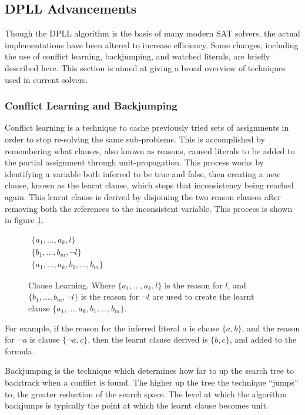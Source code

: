 \subsection{DPLL Advancements}
Though the DPLL algorithm is the basis of many modern SAT solvers, the actual implementations have been altered to increase efficiency.
Some changes, including the use of conflict learning, backjumping, and watched literals, are briefly described here.
This section is aimed at giving a broad overview of techniques used in current solvers.

\subsubsection{Conflict Learning and Backjumping}
Conflict learning \citep{stallman1976} is a technique to cache previously tried sets of assignments in order to stop re-solving the same sub-problems.
This is accomplished by remembering what clauses, also known as reasons, caused literals to be added to the partial assignment through unit-propagation. 
This process works by identifying a variable both inferred to be true and false,
then creating a new clause, known as the learnt clause, which stops that inconsistency being reached again.
This learnt clause is derived by disjoining the two reason clauses after removing both the references to the inconsistent variable.
This process is shown in figure \ref{impl.clauselearning}. 

\begin{figure}[htp]
\begin{center}
$\begin{array}{c}
\{a_1,\ldots,a_k, l\} \\
 \{b_1,\ldots,b_m,\neg l\}\\
\hline
\{a_1,\ldots,a_k, b_1,\ldots,b_m \}
\end{array}$
  \caption{Clause Learning. Where $\{a_1,\ldots,a_k, l\}$ is the reason for $l$, and $\{b_1,\ldots,b_m,\neg l\}$ is the reason for $\neg l$
   are used to create the learnt clause $\{a_1,\ldots,a_k, b_1,\ldots,b_m \}$.}
  \label{impl.clauselearning}
\end{center}
\end{figure}

For example, if the reason for the inferred literal $a$ is clause $\{a, b\}$, and the reason for $\neg a$ is clause $\{\neg a, c\}$,
then the learnt clause derived is $\{b,c\}$, and added to the formula.

Backjumping \citep{Gaschnig1979} is the technique which determines how far to up the search tree to backtrack when a conflict is found.
The higher up the tree the technique ``jumps'' to, the greater reduction of the search space.
The level at which the algorithm backjumps is typically the point at which the learnt clause becomes unit. 


